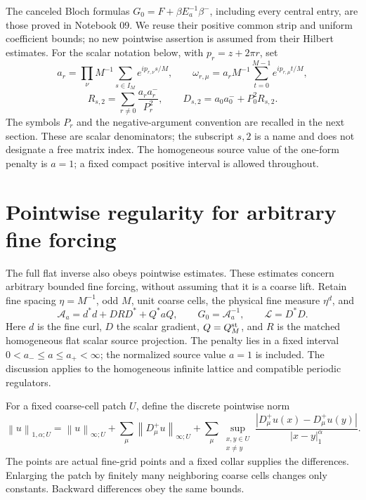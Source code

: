 \documentclass[11pt]{article}
\theoremstyle{remark}
\newcommand{\norm}[1]{\left\|#1\right\|}
\begin{document}
The canceled Bloch formulas $G_0=F+\beta E_a^{-1}\beta^-$,
including every central entry, are those proved in Notebook 09.
We reuse their positive common strip and uniform coefficient bounds;
no new pointwise assertion is assumed from their Hilbert estimates.
For the scalar notation below, with $p_r=z+2\pi r$, set
\[
 a_r=\prod_\nu M^{-1}\sum_{s\in I_M}e^{ip_{r,\nu}s/M},\qquad
 \omega_{r,\mu}=a_rM^{-1}\sum_{t=0}^{M-1}e^{ip_{r,\mu}t/M},
\]
\[
 R_{s,2}=\sum_{r\ne0}\frac{a_ra_r^-}{P_r^2},\qquad
 D_{s,2}=a_0a_0^-+P_0^2R_{s,2}.
\]
The symbols $P_r$ and the negative-argument convention are recalled
in the next section. These are scalar denominators; the subscript
$s,2$ is a name and does not designate a free matrix index.
The homogeneous source value of the one-form penalty is $a=1$;
a fixed compact positive interval is allowed throughout.
\section{Pointwise regularity for arbitrary fine forcing}
\label{pt-section}

The full flat inverse also obeys pointwise estimates. These estimates
concern arbitrary bounded fine forcing, without assuming that it is a
coarse lift. Retain fine spacing $\eta=M^{-1}$, odd $M$, unit coarse
cells, the physical fine measure $\eta^d$, and
\begin{equation}\label{pt-operator}
 \mathcal A_a=d^*d+DRD^*+Q^*aQ,\qquad G_0=\mathcal A_a^{-1},
 \qquad \mathcal L=D^*D.
\end{equation}
Here $d$ is the fine curl, $D$ the scalar gradient, $Q=Q_M^{\rm st}$,
and $R$ is the matched homogeneous flat scalar source projection.
The penalty lies in a fixed interval $0<a_-\le a\le a_+<\infty$;
the normalized source value $a=1$ is included. The discussion applies
to the homogeneous infinite lattice and compatible periodic regulators.

For a fixed coarse-cell patch $U$, define the discrete pointwise norm
\begin{equation}\label{pt-holder-norm}
 \norm{u}_{1,\alpha;U}=\norm{u}_{\infty;U}
  +\sum_\mu\norm{D_\mu^+u}_{\infty;U}
  +\sum_\mu\sup_{\substack{x,y\in U\\x\ne y}}
       \frac{|D_\mu^+u(x)-D_\mu^+u(y)|}{|x-y|_1^\alpha}.
\end{equation}
The points are actual fine-grid points and a fixed collar supplies the
differences. Enlarging the patch by finitely many neighboring coarse
cells changes only constants. Backward differences obey the same bounds.
\end{document}
